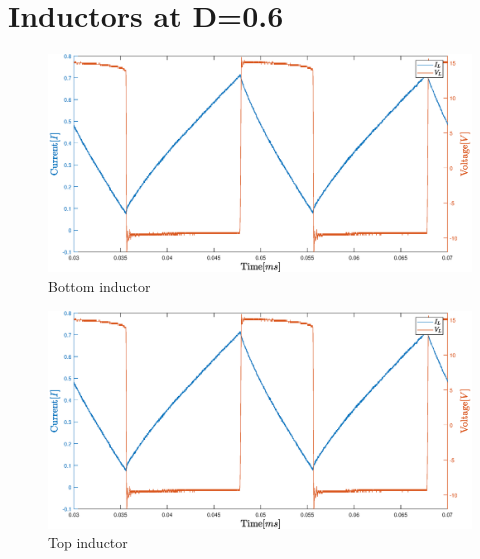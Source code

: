 \section{Inductors at D=0.6}
\begin{figure}[H]
	\centering
	\includegraphics[width=\textwidth]{figures/06Testing/botind60per.eps}
	\caption{Bottom inductor}
\end{figure}
\begin{figure}[H]
	\centering
	\includegraphics[width=\textwidth]{figures/06Testing/botind60per.eps}
	\caption{Top inductor}
\end{figure}
